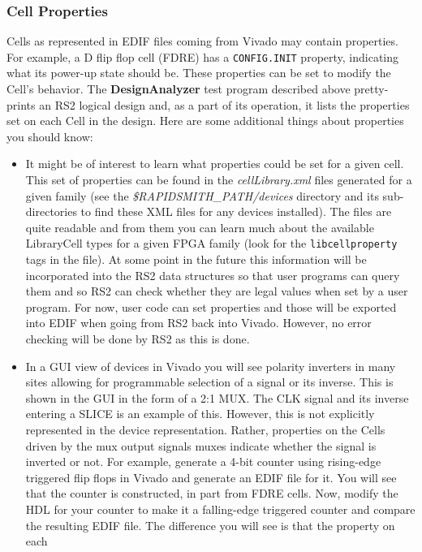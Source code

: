 \documentclass[12pt]{article}
\newcommand{\env}[1]{{\texttt{#1}}}
\newcommand{\fil}[1]{{\em #1}}
\newcommand{\cls}[1]{{\texttt{#1}}}
\newcommand{\pgm}[1]{{\textbf{#1}}}
\newcommand{\dir}[1]{{\em #1}}
\begin{document}
\subsubsection{Cell Properties}
Cells as represented in EDIF files coming from Vivado may contain properties. 
For example, a D flip flop cell (FDRE) has a \env{CONFIG.INIT} property,
indicating what its power-up state should be.  These properties can be set to modify the
Cell's behavior.  The \pgm{DesignAnalyzer} test program described above
pretty-prints an RS2 logical design and, as a part of its operation, it lists the properties
set on each Cell in the design.  Here are some additional things about
properties you should know:
\begin{itemize}
  \item	It might be of interest to learn what properties could be set
  for a given cell.  This set of properties can be found in the
  \fil{cellLibrary.xml} files generated for a given family (see the
  \dir{\$RAPIDSMITH\_PATH/devices} directory and its sub-directories to find
  these XML files for any devices installed). 
  The files are quite readable and from them you can learn much about the
  available LibraryCell types for a given FPGA family (look for the
  \cls{libcellproperty} tags in the file).  At some point in the future this
  information will be incorporated into the RS2 data structures so that user
  programs can query them and so RS2 can check whether they are legal values
  when set by a user program.   For now, user code can set properties and those
  will be exported into EDIF when going from RS2 back into Vivado.  However, no
  error checking will be done by RS2 as this is done.
  \item In a GUI view of devices in Vivado you will see polarity inverters in
  many sites allowing for programmable selection of a signal or its inverse. 
  This is shown in the GUI in the form of a 2:1 MUX.  The CLK signal
  and its inverse entering a SLICE is an example of this.  However, this is not
  explicitly represented in the device representation.  Rather, properties on
  the Cells driven by the mux output signals muxes indicate whether the signal
  is inverted or not.  For example, generate a 4-bit counter using rising-edge
  triggered flip flops in Vivado and generate an EDIF file for it.  You will see
  that the counter is constructed, in part from FDRE cells.  Now, modify the HDL
  for your counter to make it a falling-edge triggered counter and compare the
  resulting EDIF file.  The difference you will see is that the property on each

\end{itemize}
\end{document}

